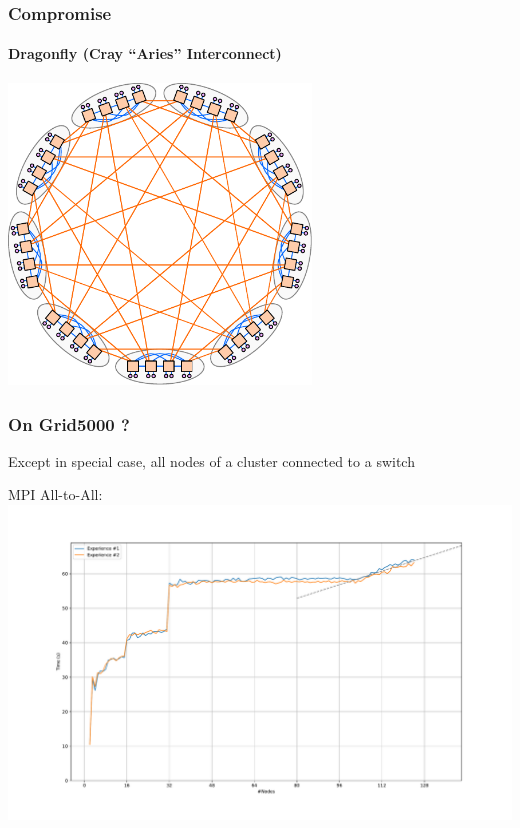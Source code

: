 \documentclass[xcolor={rgb,x11names,svgnames},rgb,x11names,svgnames]{beamer}
\begin{document}
\begin{frame}
  \frametitle{Compromise}
  \framesubtitle{Dragonfly (Cray ``Aries'' Interconnect)}

  \centering
  \includegraphics[height=8cm]{dragonfly.pdf}
\end{frame}


\begin{frame}
  \frametitle{On Grid5000 ?}
  Except in special case, all nodes of a cluster connected to a switch

  MPI All-to-All:
  \includegraphics[width=\textwidth]{gros_sort.pdf}
\end{frame}
\end{document}
